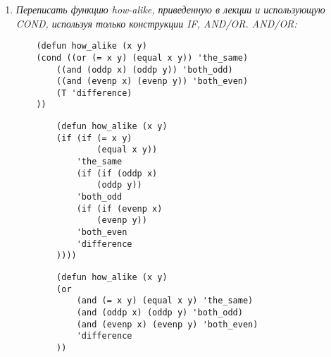 \begin{enumerate}[wide=0pt]
	\item  \textit{Переписать функцию how-alike, приведенную в лекции и использующую
	COND, используя только конструкции IF, AND/OR.
	AND/OR:}

	\begin{lstlisting}
	(defun how_alike (x y)
    (cond ((or (= x y) (equal x y)) 'the_same)
        ((and (oddp x) (oddp y)) 'both_odd)
        ((and (evenp x) (evenp y)) 'both_even)
        (T 'difference)
	))
	\end{lstlisting}


	\begin{lstlisting}
		(defun how_alike (x y)
		(if (if (= x y)
				(equal x y))
			'the_same
			(if (if (oddp x)
				(oddp y))
			'both_odd
			(if (if (evenp x)
				(evenp y))
			'both_even
			'difference
		))))
	\end{lstlisting}


	\begin{lstlisting}
		(defun how_alike (x y)
		(or
			(and (= x y) (equal x y) 'the_same)
			(and (oddp x) (oddp y) 'both_odd)
			(and (evenp x) (evenp y) 'both_even)
			'difference
		))
	\end{lstlisting}



\end{enumerate}
